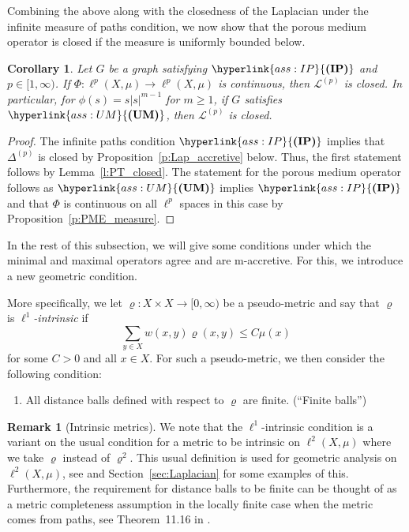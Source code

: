 \documentclass[letterpaper]{article}
\newtheorem{corollary}[lemma]{Corollary}
\theoremstyle{definition}
\newtheorem{remark}[lemma]{Remark}
\theoremstyle{named}
\numberwithin{equation}{section}
\newcommand{\IP}{\hyperlink{ass:IP}{\textup{\textbf{(IP)}}}}
\newcommand{\UM}{\hyperlink{ass:UM}{\textup{\textbf{(UM)}}}}
\newcommand{\FB}{\hyperlink{ass:FB}{\textup{\textbf{(FB)}}}}
\newcommand{\Deltaphip}{\mathcal{L}^{(p)}}
\begin{document}
Combining the above along with the closedness of the Laplacian under the infinite measure of paths condition,
we now show that the porous
medium operator is closed if the measure is uniformly bounded below.


\begin{corollary}\label{c:PT_closed}
Let $G$ be a graph satisfying $\IP$ and $p \in [1,\infty)$. 
If $\Phi\colon \ell^p(X,\mu) \to \ell^p(X,\mu)$ is continuous,
then $\Deltaphip$ is closed. In particular, for $\phi(s)=s |s|^{m-1}$ for $m \geq 1$, if $G$ satisfies $\UM$, then $\Deltaphip$
is closed.
\end{corollary}
\begin{proof}
The infinite paths condition $\IP$ implies that $\Delta^{(p)}$ is closed
by Proposition~\ref{p:Lap_accretive} below.
Thus, the first statement follows
by Lemma~\ref{l:PT_closed}.
The statement for the porous medium operator follows as $\UM$ implies $\IP$
and that $\Phi$ is continuous on all $\ell^p$ spaces in this case
by Proposition~\ref{p:PME_measure}.
\end{proof}

In the rest of this subsection,
we will give some conditions under which 
the minimal and maximal 
operators agree and  are m-accretive. For this, we introduce a new geometric condition.

More specifically, we let $\varrho: X\times X \to [0,\infty)$ 
be a pseudo-metric and 
say that $\varrho$ is \emph{$\ell^1$-intrinsic} if
$$\sum_{y \in X}w(x,y)\varrho(x,y) \leq C \mu(x)$$ 
for some $C>0$ and all $x \in X$.
For such a pseudo-metric, we then consider the following condition:
\begin{enumerate}
\item[$\FB$]\hypertarget{ass:FB}{} All distance balls defined with respect to $\varrho$ are finite. \hfill(``Finite balls'')
\end{enumerate}

\smallskip

\begin{remark}[Intrinsic metrics]
We note that the $\ell^1$-intrinsic condition is a 
variant on the usual condition for a metric to be intrinsic on $\ell^2(X,\mu)$
where we take $\varrho$ instead of $\varrho^2$. This usual definition is used for geometric
analysis on $\ell^2(X,\mu)$, see \cite{Kel15, keller2021graphs} and Section~\ref{sec:Laplacian}
for some examples of this. 
Furthermore, the requirement for distance balls to be finite
can be thought of as a metric completeness assumption in the locally finite case
when the metric comes from paths,
see Theorem~11.16 in \cite{keller2021graphs}.
\end{remark}
\end{document}
